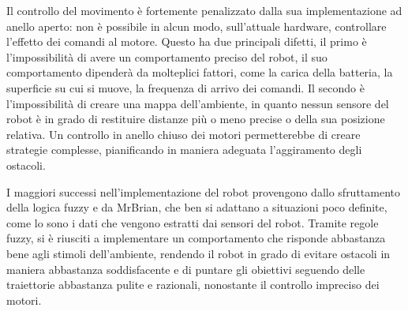 Il controllo del movimento è fortemente penalizzato dalla sua implementazione ad anello aperto: non è possibile in alcun modo, sull'attuale hardware, controllare l'effetto dei comandi al motore. Questo ha due principali difetti, il primo è l'impossibilità di avere un comportamento preciso del robot, il suo comportamento dipenderà da molteplici fattori, come la carica della batteria, la superficie su cui si muove, la frequenza di arrivo dei comandi. Il secondo è l'impossibilità di creare una mappa dell'ambiente, in quanto nessun sensore del robot è in grado di restituire distanze più o meno precise o della sua posizione relativa. Un controllo in anello chiuso dei motori permetterebbe di creare strategie complesse, pianificando in maniera adeguata l'aggiramento degli ostacoli. %

I maggiori successi nell'implementazione del robot provengono dallo sfruttamento della logica fuzzy e da MrBrian, che ben si adattano a situazioni poco definite, come lo sono i dati che vengono estratti dai sensori del robot. Tramite regole fuzzy, si è riusciti a implementare un comportamento che risponde abbastanza bene agli stimoli dell'ambiente, rendendo il robot in grado di evitare ostacoli in maniera abbastanza soddisfacente e di puntare gli obiettivi seguendo delle traiettorie abbastanza pulite e razionali, nonostante il controllo impreciso dei motori. %



